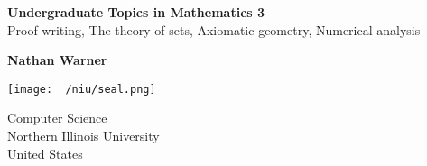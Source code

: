 \documentclass{report}
\title{\Huge{}}
\author{\huge{Nathan Warner}}
\date{\huge{}}
\begin{document}
        \begin{titlepage}
       \begin{center}
           \vspace*{1cm}
    
           \textbf{Undergraduate Topics in Mathematics 3} \\
           Proof writing, The theory of sets, Axiomatic geometry, Numerical analysis
    
           \vspace{0.5cm}
            
                
           \vspace{1.5cm}
    
           \textbf{Nathan Warner}
    
           \vfill
                
                
           \vspace{0.8cm}
         
           \texttt{[image: ~/niu/seal.png]}
                
           Computer Science \\
           Northern Illinois University\\
           United States\\
           
                
       \end{center}
    \end{titlepage}
    \tableofcontents
    \pagebreak 
    \bigbreak \noindent 
\end{document}
